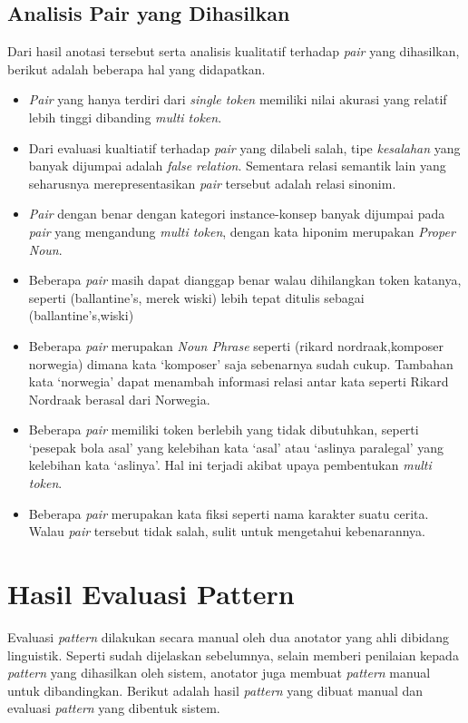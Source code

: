 \subsection{Analisis Pair yang Dihasilkan}
Dari hasil anotasi tersebut serta analisis kualitatif terhadap \textit{pair} yang dihasilkan, berikut adalah beberapa hal yang didapatkan.
\begin{itemize} 
  \item \textit{Pair} yang hanya terdiri dari \textit{single token} memiliki nilai akurasi yang relatif lebih tinggi dibanding \textit{multi token}.
  \item Dari evaluasi kualtiatif terhadap \textit{pair} yang dilabeli salah, tipe \textit{kesalahan} yang banyak dijumpai adalah \textit{false relation}. Sementara relasi semantik lain yang seharusnya merepresentasikan \textit{pair} tersebut adalah relasi sinonim.
  \item \textit{Pair} dengan benar dengan kategori instance-konsep banyak dijumpai pada \textit{pair} yang mengandung \textit{multi token}, dengan kata hiponim merupakan \textit{Proper Noun}. 
  \item Beberapa \textit{pair} masih dapat dianggap benar walau dihilangkan token katanya, seperti (ballantine's, merek wiski) lebih tepat ditulis sebagai (ballantine's,wiski)
  \item Beberapa \textit{pair} merupakan \textit{Noun Phrase} seperti (rikard nordraak,komposer norwegia) dimana kata `komposer' saja sebenarnya sudah cukup. Tambahan kata `norwegia' dapat menambah informasi relasi antar kata seperti Rikard Nordraak berasal dari Norwegia.
  \item Beberapa \textit{pair} memiliki token berlebih yang tidak dibutuhkan, seperti `pesepak bola asal' yang kelebihan kata `asal' atau `aslinya paralegal' yang kelebihan kata `aslinya'. Hal ini terjadi akibat upaya pembentukan \textit{multi token}. 
  \item Beberapa \textit{pair} merupakan kata fiksi seperti nama karakter suatu cerita. Walau \textit{pair} tersebut tidak salah, sulit untuk mengetahui kebenarannya.
\end{itemize}

\section{Hasil Evaluasi Pattern}
Evaluasi \textit{pattern} dilakukan secara manual oleh dua anotator yang ahli dibidang linguistik. Seperti sudah dijelaskan sebelumnya, selain memberi penilaian kepada \textit{pattern} yang dihasilkan oleh sistem, anotator juga membuat \textit{pattern} manual untuk dibandingkan. Berikut adalah hasil \textit{pattern} yang dibuat manual dan evaluasi \textit{pattern} yang dibentuk sistem.

